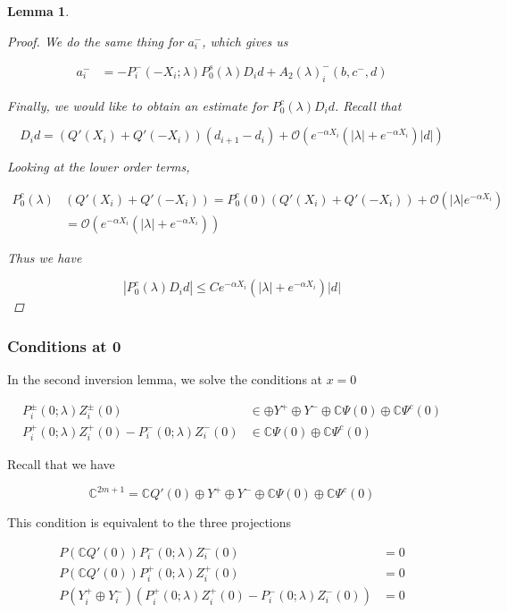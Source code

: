 \documentclass[12pt]{article}
\def\C{{\mathbb C}}
\newtheorem{lemma}{Lemma}
\begin{document}
\begin{lemma}
\begin{proof}
We do the same thing for $a_i^-$, which gives us

\begin{align*}
a_i^- &= -P_i^-(-X_i; \lambda) P_0^s(\lambda) D_i d + A_2(\lambda)_i^-(b, c^-, d)
\end{align*}

Finally, we would like to obtain an estimate for $P_0^c(\lambda) D_i d$. Recall that

\[
D_i d = ( Q'(X_i) + Q'(-X_i))(d_{i+1} - d_i ) + \mathcal{O} \left( e^{-\alpha X_i} \left( |\lambda| +  e^{-\alpha X_i}  \right) |d| \right) 
\]

Looking at the lower order terms,

\begin{align*}
P_0^c(\lambda)&( Q'(X_i) + Q'(-X_i)) 
= P_0^c(0)( Q'(X_i) + Q'(-X_i)) + \mathcal{O}(|\lambda|e^{-\alpha X_i}) \\
&= \mathcal{O}(e^{-\alpha X_i}(|\lambda| + e^{-\alpha X_i}))
\end{align*}

Thus we have

\[
|P_0^c(\lambda) D_i d| \leq C e^{-\alpha X_i}(|\lambda| + e^{-\alpha X_i})|d|
\]

\end{proof}
\end{lemma}

\subsubsection{Conditions at 0}

In the second inversion lemma, we solve the conditions at $x = 0$

\begin{align*}
P_i^\pm(0; \lambda) Z_i^\pm(0) &\in \oplus Y^+ \oplus Y^- \oplus \C \Psi(0) \oplus \C \Psi^c(0) \\
P_i^+(0; \lambda) Z_i^+(0) - P_i^-(0; \lambda) Z_i^-(0) &\in \C \Psi(0) \oplus \C \Psi^c(0)
\end{align*}

Recall that we have

\begin{equation}\label{DSdecomp}
\C^{2m+1} = \C Q'(0) \oplus Y^+ \oplus Y^- \oplus \C \Psi(0) \oplus \C \Psi^c(0)
\end{equation}

This condition is equivalent to the three projections

\begin{align*}
P(\C Q'(0) ) P_i^-(0; \lambda) Z_i^-(0) &= 0 \\
P(\C Q'(0) ) P_i^+(0; \lambda) Z_i^+(0) &= 0 \\
P(Y_i^+ \oplus Y_i^-) ( P_i^+(0; \lambda) Z_i^+(0) - P_i^-(0; \lambda) Z_i^-(0) ) &= 0
\end{align*}
\end{document}

